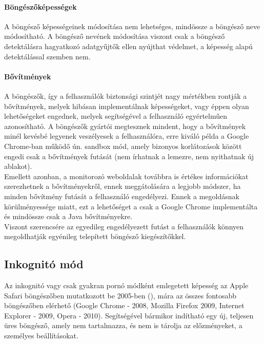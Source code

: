 \paragraph{Böngészőképességek} %
\label{par:böngészőképességek}
A böngésző képességeinek módosítása nem lehetséges, mindössze a böngésző neve módosítható. A böngésző nevének módosítása viszont csak a böngésző detektálásra hagyatkozó adatgyűjtők ellen nyújthat védelmet, a képesség alapú detektálással szemben nem.
\\
\paragraph{Bővítmények} %
\label{par:bővítmények_security}
A böngészők, így a felhasználók biztonsági szintjét nagy mértékben rontják a bővítmények, melyek hibásan implementálnak képességeket, vagy éppen olyan lehetőségeket engednek, melyek segítségével a felhasználó egyértelműen azonosítható. A böngészők gyártói megtesznek mindent, hogy a bővítmények minél kevésbé legyenek veszélyesek a felhasználóra, erre kiváló példa a Google Chrome-ban működő ún. sandbox mód, amely bizonyos korlátozások között engedi csak a bővítmények futását (nem írhatnak a lemezre, nem nyithatnak új ablakot). \cite{chromium_sandbox}\hfill\\
Emellett azonban, a monitorozó weboldalak továbbra is értékes információkat szerezhetnek a bővítményekről, ennek meggátolására a legjobb módszer, ha minden bővítmény futását a felhasználó engedélyezi. Ennek a megoldásnak körülményessége miatt, ezt a lehetőséget a csak a Google Chrome implementálta és mindössze csak a Java bővítményekre. \cite{chrome_disabled_java}\hfill\\
Viszont szerencsére az egyedileg engedélyezett futást a felhasználók könnyen megoldhatják egyénileg telepített böngésző kiegészítőkkel.


\subsection{Inkognitó mód} %

Az inkognitó vagy csak gyakran pornó módként emlegetett képesség az Apple Safari böngészőben mutatkozott be 2005-ben (\cite{safari_pornmode}), mára az összes fontosabb böngészőben elérhető (Google Chrome - 2008, Mozilla Firefox 2009, Internet Explorer - 2009, Opera - 2010). Segítségével bármikor indítható egy új, teljesen üres böngésző, amely nem tartalmazza, és nem is tárolja az előzményeket, a személyes beállításokat.\hfill\\

